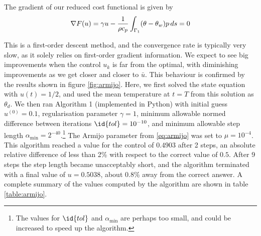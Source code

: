 The gradient of our reduced cost functional is given by
%
\begin{equation*}
    \nabla F(u) =  \gamma u - \frac{1}{\rho c_p} \int_{\Gamma_1} (\theta - \theta_w)p \mathop{ds} = 0
\end{equation*}
%

This is a first-order descent method, and the convergence rate is typically very slow, as it solely relies on first-order gradient information. We expect to see big improvements when the control $u_k$ is far from the optimal, with diminishing improvements as we get closer and closer to $\bar{u}$. This behaviour is confirmed by the results shown in figure \ref{fig:armijo}. Here, we first solved the state equation with $u(t) = 1/2$, and used the mean temperature at $t=T$ from this solution as $\theta_d$. We then ran Algorithm 1 (implemented in Python) with initial guess $u^{(0)} = 0.1$, regularisation parameter $\gamma = 1$, minimum allowable normed difference between iterations $\id{tol} = 10^{-10}$, and minimum allowable step length $\alpha_{\min} = 2^{-40}$.\footnote{The values for $\id{tol}$ and $\alpha_{\min}$ are perhaps too small, and could be increased to speed up the algorithm.} The Armijo parameter from \eqref{eq:armijo} was set to $\mu=10^{-4}$. This algorithm reached a value for the control of $0.4903$ after 2 steps, an absolute relative difference of less than 2\% with respect to the correct value of $0.5$. After 9 steps the step length became unacceptably short, and the algorithm terminated with a final value of $u=0.5038$, about 0.8\% away from the correct answer. A complete summary of the values computed by the algorithm are shown in table \ref{table:armijo}. 
